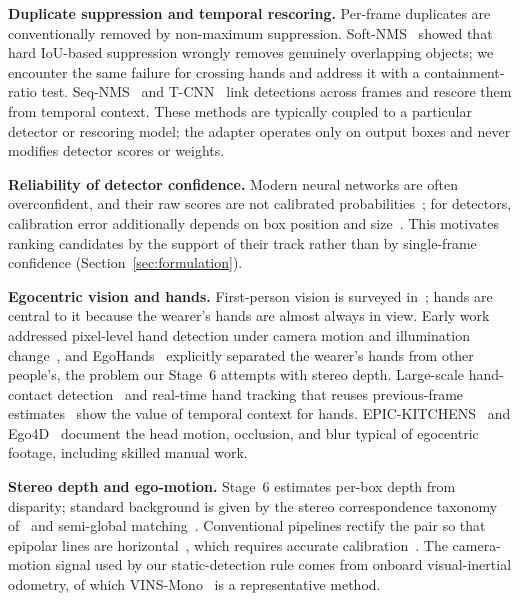 \documentclass[journal]{IEEEtran}
\begin{document}
\textbf{Duplicate suppression and temporal rescoring.} Per-frame duplicates are conventionally removed by non-maximum suppression. Soft-NMS~\cite{bodla2017softnms} showed that hard IoU-based suppression wrongly removes genuinely overlapping objects; we encounter the same failure for crossing hands and address it with a containment-ratio test. Seq-NMS~\cite{han2016seqnms} and T-CNN~\cite{kang2018tcnn} link detections across frames and rescore them from temporal context. These methods are typically coupled to a particular detector or rescoring model; the adapter operates only on output boxes and never modifies detector scores or weights.

\textbf{Reliability of detector confidence.} Modern neural networks are often overconfident, and their raw scores are not calibrated probabilities~\cite{guo2017calibration}; for detectors, calibration error additionally depends on box position and size~\cite{kuppers2020calibration}. This motivates ranking candidates by the support of their track rather than by single-frame confidence (Section~\ref{sec:formulation}).

\textbf{Egocentric vision and hands.} First-person vision is surveyed in~\cite{betancourt2015fpv}; hands are central to it because the wearer's hands are almost always in view. Early work addressed pixel-level hand detection under camera motion and illumination change~\cite{li2013pixelhand}, and EgoHands~\cite{bambach2015egohands} explicitly separated the wearer's hands from other people's, the problem our Stage~6 attempts with stereo depth. Large-scale hand-contact detection~\cite{shan2020hands} and real-time hand tracking that reuses previous-frame estimates~\cite{zhang2020mediapipe} show the value of temporal context for hands. EPIC-KITCHENS~\cite{damen2018epic} and Ego4D~\cite{grauman2022ego4d} document the head motion, occlusion, and blur typical of egocentric footage, including skilled manual work.

\textbf{Stereo depth and ego-motion.} Stage~6 estimates per-box depth from disparity; standard background is given by the stereo correspondence taxonomy of~\cite{scharstein2002taxonomy} and semi-global matching~\cite{hirschmuller2008sgm}. Conventional pipelines rectify the pair so that epipolar lines are horizontal~\cite{fusiello2000rectification}, which requires accurate calibration~\cite{zhang2000calibration}. The camera-motion signal used by our static-detection rule comes from onboard visual-inertial odometry, of which VINS-Mono~\cite{qin2018vins} is a representative method.
\end{document}
